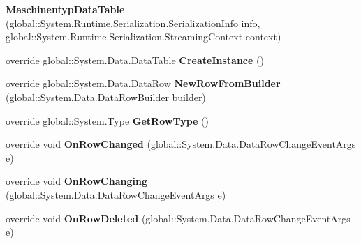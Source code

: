 \begin{DoxyCompactItemize}
\item 
{\bfseries Maschinentyp\+Data\+Table} (global\+::\+System.\+Runtime.\+Serialization.\+Serialization\+Info info, global\+::\+System.\+Runtime.\+Serialization.\+Streaming\+Context context)\hypertarget{class_products_1_1_data_1_1ds_sage_1_1_maschinentyp_data_table_a8e4b91691662db69bd84759c8b30b498}{}\label{class_products_1_1_data_1_1ds_sage_1_1_maschinentyp_data_table_a8e4b91691662db69bd84759c8b30b498}

\item 
override global\+::\+System.\+Data.\+Data\+Table {\bfseries Create\+Instance} ()\hypertarget{class_products_1_1_data_1_1ds_sage_1_1_maschinentyp_data_table_ae8fc6a282a48f2c7520025de0a2e6664}{}\label{class_products_1_1_data_1_1ds_sage_1_1_maschinentyp_data_table_ae8fc6a282a48f2c7520025de0a2e6664}

\item 
override global\+::\+System.\+Data.\+Data\+Row {\bfseries New\+Row\+From\+Builder} (global\+::\+System.\+Data.\+Data\+Row\+Builder builder)\hypertarget{class_products_1_1_data_1_1ds_sage_1_1_maschinentyp_data_table_a0d3601349cc6f6c32bd989707a619b5d}{}\label{class_products_1_1_data_1_1ds_sage_1_1_maschinentyp_data_table_a0d3601349cc6f6c32bd989707a619b5d}

\item 
override global\+::\+System.\+Type {\bfseries Get\+Row\+Type} ()\hypertarget{class_products_1_1_data_1_1ds_sage_1_1_maschinentyp_data_table_a1fe448f05ea8e4761b2eed96dff3712a}{}\label{class_products_1_1_data_1_1ds_sage_1_1_maschinentyp_data_table_a1fe448f05ea8e4761b2eed96dff3712a}

\item 
override void {\bfseries On\+Row\+Changed} (global\+::\+System.\+Data.\+Data\+Row\+Change\+Event\+Args e)\hypertarget{class_products_1_1_data_1_1ds_sage_1_1_maschinentyp_data_table_a4eb642af9ab70e68526683e15f5540a4}{}\label{class_products_1_1_data_1_1ds_sage_1_1_maschinentyp_data_table_a4eb642af9ab70e68526683e15f5540a4}

\item 
override void {\bfseries On\+Row\+Changing} (global\+::\+System.\+Data.\+Data\+Row\+Change\+Event\+Args e)\hypertarget{class_products_1_1_data_1_1ds_sage_1_1_maschinentyp_data_table_a0eec865b7f6f02868fc0a77e22376d83}{}\label{class_products_1_1_data_1_1ds_sage_1_1_maschinentyp_data_table_a0eec865b7f6f02868fc0a77e22376d83}

\item 
override void {\bfseries On\+Row\+Deleted} (global\+::\+System.\+Data.\+Data\+Row\+Change\+Event\+Args e)\hypertarget{class_products_1_1_data_1_1ds_sage_1_1_maschinentyp_data_table_a427267dd033dd344d9bd059593aaae66}{}\label{class_products_1_1_data_1_1ds_sage_1_1_maschinentyp_data_table_a427267dd033dd344d9bd059593aaae66}


\end{DoxyCompactItemize}
